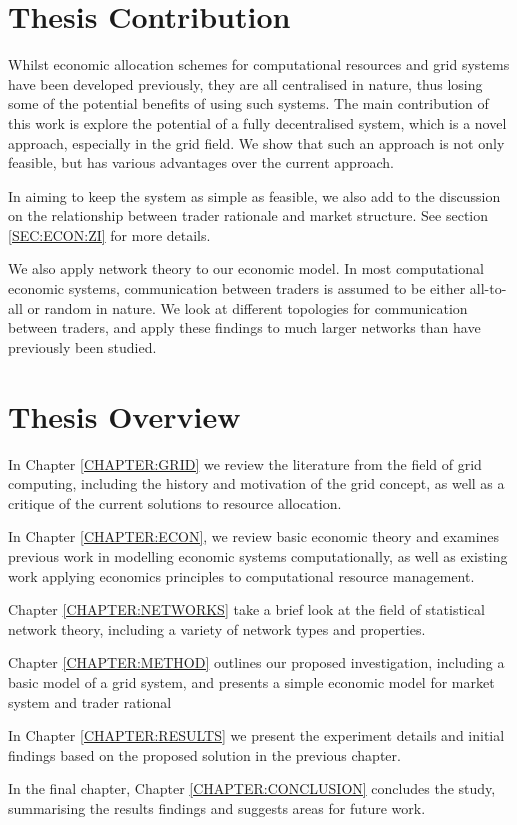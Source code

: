 \section{Thesis Contribution}

Whilst economic allocation schemes for computational resources and grid systems
have been developed previously, they are all centralised in nature, thus losing
some of the potential benefits of using such systems. The main contribution of
this work is explore the potential of a fully decentralised system, which is a novel
approach, especially in the grid field. We show that such an approach is not
only feasible, but has various advantages over the current approach.

In aiming to keep the system as simple as feasible, we also add to the
discussion on the relationship between trader rationale and market structure.
See section \ref{SEC:ECON:ZI} for more details.

We also apply network theory to our economic model. In most computational economic
systems, communication between traders is assumed to be either all-to-all or
random in nature. We look at different topologies for communication between
traders, and apply these findings to much larger networks than have previously
been studied.



\section{Thesis Overview}

In Chapter \ref{CHAPTER:GRID} we review the literature from the field of grid
computing, including the history and motivation of the grid concept, as well as
a critique of the current solutions to resource allocation.

In Chapter \ref{CHAPTER:ECON}, we review basic economic theory and examines
previous work in modelling economic systems computationally, as well as existing
work applying economics principles to computational resource management.

Chapter \ref{CHAPTER:NETWORKS} take a brief look at the field of statistical
network theory, including a variety of network types and properties.

Chapter \ref{CHAPTER:METHOD} outlines our proposed investigation, including a
basic model of a grid system, and presents a simple economic model for
market system and trader rational

In Chapter \ref{CHAPTER:RESULTS} we present the experiment details and initial
findings based on the proposed solution in the previous chapter.

In the final chapter, Chapter \ref{CHAPTER:CONCLUSION} concludes the study,
summarising the results findings and suggests areas for future work.


